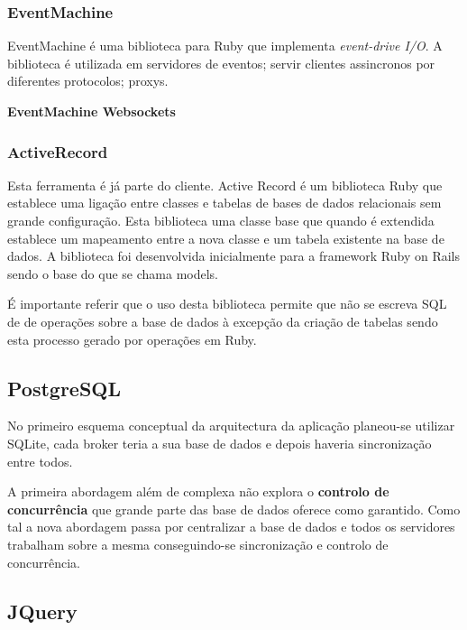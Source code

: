 \subsubsection{EventMachine}

EventMachine é uma biblioteca para Ruby que implementa \textit{event-drive I/O}.
A biblioteca é utilizada em servidores de eventos; servir clientes assincronos por diferentes protocolos; proxys.

\textbf{EventMachine Websockets}

\subsubsection{ActiveRecord}
Esta ferramenta é já parte do cliente.
Active Record é um biblioteca Ruby que establece uma ligação entre classes e tabelas de bases de dados relacionais sem grande configuração. Esta biblioteca uma classe base que quando é extendida establece um mapeamento entre a nova classe e um tabela existente na base de dados. A biblioteca foi desenvolvida inicialmente para a framework Ruby on Rails sendo o base do que se chama models.

É importante referir que o uso desta biblioteca permite que não se escreva SQL de de operações sobre a base de dados à excepção da criação de tabelas sendo esta processo gerado por operações em Ruby.

\subsection{PostgreSQL}

No primeiro esquema conceptual da arquitectura da aplicação planeou-se utilizar SQLite, cada broker teria a sua base de dados e depois haveria sincronização entre todos. 

A primeira abordagem além de complexa não explora o \textbf{controlo de concurrência} que grande parte das base de dados oferece como garantido. Como tal a nova abordagem passa por centralizar a base de dados e todos os servidores trabalham sobre a mesma conseguindo-se sincronização e controlo de concurrência.

\subsection{JQuery}

